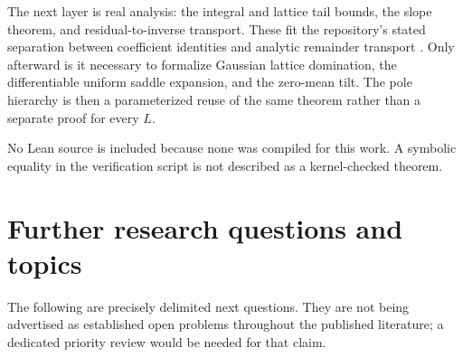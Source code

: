 \documentclass[11pt,a4paper]{article}
\numberwithin{equation}{section}
\theoremstyle{definition}\newtheorem{definition}[theorem]{Definition}
\theoremstyle{remark}\newtheorem{remark}[theorem]{Remark}
\begin{document}
The next layer is real analysis: the integral and lattice tail bounds,
the slope theorem, and residual-to-inverse transport. These fit the
repository's stated separation between coefficient identities and analytic
remainder transport \cite{repo-canonical}. Only afterward is it necessary
to formalize Gaussian lattice domination, the differentiable uniform
saddle expansion, and the zero-mean tilt. The pole hierarchy is then a
parameterized reuse of the same theorem rather than a separate proof for
every $L$.

No Lean source is included because none was compiled for this work.
A symbolic equality in the verification script is not described as a
kernel-checked theorem.

\section{Further research questions and topics}
\label{sec:questions}

The following are precisely delimited next questions. They are not being
advertised as established open problems throughout the published
literature; a dedicated priority review would be needed for that claim.
\end{document}
